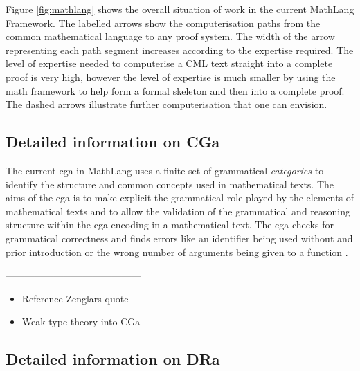 Figure \ref{fig:mathlang} shows the overall situation of work in the current MathLang Framework.
The labelled arrows show the computerisation paths from the common mathematical language to any proof system. 
The width of the arrow representing each path segment increases according to the expertise required. The level of expertise needed to computerise a CML text straight into a complete proof is very high, however the level of expertise is much smaller by using the \gls{math} framework to help form a formal skeleton and then into a complete proof. The dashed arrows illustrate further computerisation that one can envision.


\subsection{Detailed information on CGa}
\label{subsec:cga}
The current \gls{cga} in MathLang uses a finite set of grammatical \textit{categories} to identify the 
structure and common concepts used in mathematical texts. The aims of the \gls{cga} is to make explicit 
the grammatical role played by the elements of mathematical texts and to allow the validation of the grammatical and reasoning 
structure within the \gls{cga} encoding in a mathematical text. The \gls{cga} checks for grammatical correctness and finds errors like 
an identifier being used without and prior introduction or the wrong number of arguments being given to a function \cite{krzysztofphd}.

------------------------------------------

\begin{itemize}
\item Reference Zenglars quote

\item Weak type theory into CGa

\end{itemize}

\subsection{Detailed information on DRa}
\label{subsec:dra}

